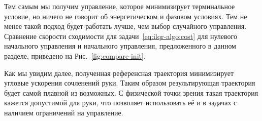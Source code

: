 \documentclass[../../doc.tex]{subfiles}
\begin{document}
    Тем самым мы получим управление, которое минимизирует терминальное условие, но ничего не говорит об энергетическом и фазовом условиях.
    Тем не менее такой подход будет работать лучше, чем выбор случайного управления.
    Сравнение скорости сходимости для задачи~\eqref{eq:ilqr-algo:cost} для нулевого начального управления и начального управления, предложенного в данном разделе, приведено на Рис.~\ref{fig:compare-init}.

    \begin{remark}
        Как мы увидим далее, полученная референсная траектория минимизирует угловые ускорения сочленений руки.
        Таким образом результирующая траектория будет самой плавной из возможных.
        С физической точки зрения такая траектория кажется допустимой для руки,
        что позволяет использовать её и в задачах с наличием ограничений на управление.
    \end{remark}

    \ifSubfilesClassLoaded{
        \nocite{*}
        \clearpage
        
        
    }{}
\end{document}
